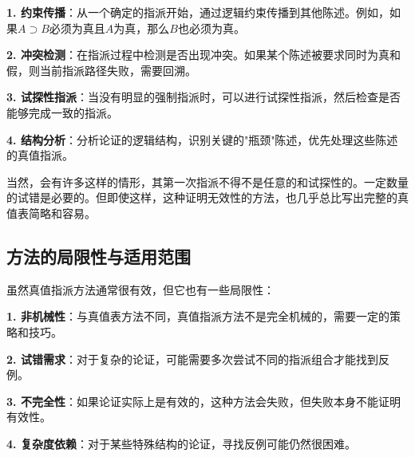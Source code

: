 \begin{examplebox}[title=真值指派的高级策略]
\textbf{1. 约束传播}：从一个确定的指派开始，通过逻辑约束传播到其他陈述。例如，如果$A \supset B$必须为真且$A$为真，那么$B$也必须为真。

\textbf{2. 冲突检测}：在指派过程中检测是否出现冲突。如果某个陈述被要求同时为真和假，则当前指派路径失败，需要回溯。

\textbf{3. 试探性指派}：当没有明显的强制指派时，可以进行试探性指派，然后检查是否能够完成一致的指派。

\textbf{4. 结构分析}：分析论证的逻辑结构，识别关键的"瓶颈"陈述，优先处理这些陈述的真值指派。
\end{examplebox}

当然，会有许多这样的情形，其第一次指派不得不是任意的和试探性的。一定数量的试错是必要的。但即使这样，这种证明无效性的方法，也几乎总比写出完整的真值表简略和容易。

\subsection{方法的局限性与适用范围}

\begin{theorembox}[title=真值指派方法的局限性]
虽然真值指派方法通常很有效，但它也有一些局限性：

\textbf{1. 非机械性}：与真值表方法不同，真值指派方法不是完全机械的，需要一定的策略和技巧。

\textbf{2. 试错需求}：对于复杂的论证，可能需要多次尝试不同的指派组合才能找到反例。

\textbf{3. 不完全性}：如果论证实际上是有效的，这种方法会失败，但失败本身不能证明有效性。

\textbf{4. 复杂度依赖}：对于某些特殊结构的论证，寻找反例可能仍然很困难。
\end{theorembox}

